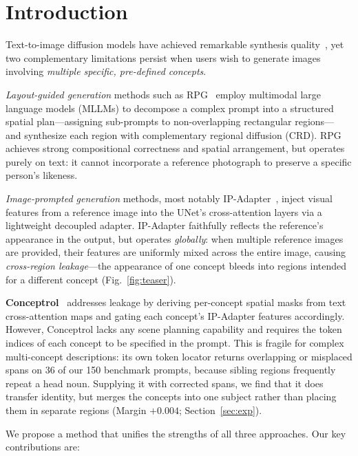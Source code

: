 \documentclass[10pt,twocolumn,letterpaper]{article}
\begin{document}
\section{Introduction}
\label{sec:intro}

Text-to-image diffusion models have achieved remarkable synthesis
quality~\cite{rombach2022high,podell2024sdxl}, yet two complementary
limitations persist when users wish to generate images involving
\emph{multiple specific, pre-defined concepts}.

\textit{Layout-guided generation} methods such as
RPG~\cite{yang2024mastering} employ multimodal large language models
(MLLMs) to decompose a complex prompt into a structured spatial
plan—assigning sub-prompts to non-overlapping rectangular regions—
and synthesize each region with complementary regional diffusion
(CRD).  RPG achieves strong compositional correctness and spatial
arrangement, but operates purely on text: it cannot incorporate a
reference photograph to preserve a specific person's likeness.

\textit{Image-prompted generation} methods, most notably
IP-Adapter~\cite{ye2023ip}, inject visual features from a reference
image into the UNet's cross-attention layers via a lightweight
decoupled adapter.  IP-Adapter faithfully reflects the reference's
appearance in the output, but operates \emph{globally}: when multiple
reference images are provided, their features are uniformly mixed
across the entire image, causing \emph{cross-region leakage}—the
appearance of one concept bleeds into regions intended for a different
concept (Fig.~\ref{fig:teaser}).

\textbf{Conceptrol}~\cite{he2025conceptrol} addresses leakage by
deriving per-concept spatial masks from text cross-attention maps and
gating each concept's IP-Adapter features accordingly.  However,
Conceptrol lacks any scene planning capability and requires the token indices
of each concept to be specified in the prompt.  This is fragile for complex
multi-concept descriptions: its own token locator returns overlapping or
misplaced spans on 36 of our 150 benchmark prompts, because sibling regions
frequently repeat a head noun.  Supplying it with corrected spans, we find that
it does transfer identity, but merges the concepts into one subject rather than
placing them in separate regions (Margin $+0.004$; Section~\ref{sec:exp}).

We propose a method that unifies the strengths of all three
approaches.  Our key contributions are:
\end{document}
